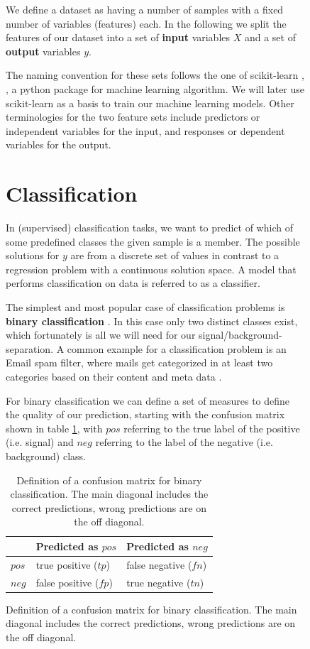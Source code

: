 \begin{figure}
We define a dataset as having a number of samples with a fixed number of
variables (features) each.
In the following we split
the features of our dataset into a set of \textbf{input} variables $X$ and
a set of \textbf{output} variables $y$.

The naming convention for
these sets follows the one of scikit-learn
\cite{scikit-learn}, \cite{sklearn_api}, a python package for
machine learning algorithm.
We will later use scikit-learn as a basis to train our machine learning models.
Other terminologies for the two feature sets include
predictors or independent variables for the input, and
responses or dependent variables for the output.


\section{Classification}
In (supervised) classification tasks, we want to predict of which of some
predefined classes the given sample is a member. The possible solutions for $y$
are from a discrete set of values in
contrast to a regression problem with a continuous solution space.
A model that performs classification on data is referred to as a
classifier.

The simplest and most popular case of classification problems
is \textbf{binary classification} \cite{sokolova2009systematic}.
In this case only two distinct
classes exist, which fortunately is all we will need for
our signal/background-separation.
A common example for a classification problem is an Email spam filter,
where mails get categorized in at least two categories based
on their content and meta data \cite{DBLP:journals/corr/cs-CL-0006013}.

For binary classification we can define a set of measures
to define the quality of our prediction, starting with the confusion matrix
shown in table \ref{tab:confusion},
with $pos$ referring to the true label of the positive (i.e. signal)
and $neg$ referring to the label of the negative (i.e. background) class.

\begin{table}
    \caption{Definition of a confusion matrix for binary classification.
    The main diagonal includes the correct predictions, wrong predictions are on the off diagonal.}
    \begin{center}
        \begin{tabular}{ l| l l}
            {} & Predicted as $pos$ & Predicted as $neg$ \\
            \hline
            $pos$ & true positive ($tp$) & false negative ($fn$) \\
            $neg$ & false positive ($fp$) & true negative ($tn$) \\
        \end{tabular}
    \end{center}
    \label{tab:confusion}
\end{table}


\end{figure}
